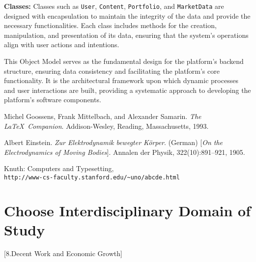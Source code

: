 \documentclass[12pt]{report}
\begin{document}
\textbf{Classes:}
Classes such as \texttt{User}, \texttt{Content}, \texttt{Portfolio}, and \texttt{MarketData} are designed with encapsulation to maintain the integrity of the data and provide the necessary functionalities. Each class includes methods for the creation, manipulation, and presentation of its data, ensuring that the system's operations align with user actions and intentions.

This Object Model serves as the fundamental design for the platform's backend structure, ensuring data consistency and facilitating the platform's core functionality. It is the architectural framework upon which dynamic processes and user interactions are built, providing a systematic approach to developing the platform's software components.


\begin{thebibliography}{9}
Michel Goossens, Frank Mittelbach, and Alexander Samarin. 
\textit{The \LaTeX\ Companion}. 
Addison-Wesley, Reading, Massachusetts, 1993.
 
Albert Einstein. 
\textit{Zur Elektrodynamik bewegter K{\"o}rper}. (German) 
[\textit{On the Electrodynamics of Moving Bodies}]. 
Annalen der Physik, 322(10):891–921, 1905.
 
Knuth: Computers and Typesetting,
\\\texttt{http://www-cs-faculty.stanford.edu/\~{}uno/abcde.html}
\end{thebibliography}


\section{Choose Interdisciplinary Domain of Study}
[8.Decent Work and Economic Growth]
\end{document}
